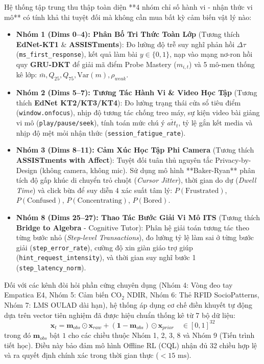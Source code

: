 \documentclass[11pt,a4paper]{article}
\begin{document}
Hệ thống tập trung thu thập toàn diện **4 nhóm chỉ số hành vi - nhận thức vi mô** có tính khả thi tuyệt đối mà không cần mua bất kỳ cảm biến vật lý nào:
\begin{itemize}
  \item \textbf{Nhóm 1 (Dims 0--4): Phân Bố Tri Thức Toàn Lớp} (Tương thích \textbf{EdNet-KT1} \& \textbf{ASSISTments}): Đo lường độ trễ suy nghĩ phản hồi $\Delta\tau$ (\texttt{ms\_first\_response}), kết quả làm bài $y \in \{0, 1\}$, nạp vào mạng nơ-ron hồi quy \textbf{GRU-DKT} để giải mã điểm Probe Mastery ($m_{i, t}$) và 5 mô-men thống kê lớp: $\bar{m}, Q_{25}, Q_{75}, \text{Var}(m), \rho_{weak}$.
  \item \textbf{Nhóm 2 (Dims 5--7): Tương Tác Hành Vi \& Video Học Tập} (Tương thích \textbf{EdNet KT2/KT3/KT4}): Đo lường trạng thái cửa sổ tiêu điểm (\texttt{window.onfocus}), nhịp độ tương tác chống treo máy, sự kiện video bài giảng vi mô (\texttt{play/pause/seek}), tính toán mức chú ý $\bar{att}_t$, tỷ lệ gắn kết media và nhịp độ mệt mỏi nhận thức (\texttt{session\_fatigue\_rate}).
  \item \textbf{Nhóm 3 (Dims 8--11): Cảm Xúc Học Tập Phi Camera} (Tương thích \textbf{ASSISTments with Affect}): Tuyệt đối tuân thủ nguyên tắc Privacy-by-Design (không camera, không mic). Sử dụng mô hình **Baker-Ryan** phân tích độ gấp khúc di chuyển trỏ chuột (\textit{Cursor Jitter}), thời gian do dự (\textit{Dwell Time}) và click bừa để suy diễn 4 xác suất tâm lý: $P(\text{Frustrated})$, $P(\text{Confused})$, $P(\text{Concentrating})$, $P(\text{Bored})$.
  \item \textbf{Nhóm 8 (Dims 25--27): Thao Tác Bước Giải Vi Mô ITS} (Tương thích \textbf{Bridge to Algebra} - Cognitive Tutor): Phân hệ giải toán tương tác theo từng bước nhỏ (\textit{Step-level Transactions}), đo lường tỷ lệ làm sai ở từng bước giải (\texttt{step\_error\_rate}), cường độ xin giàn giáo trợ giúp (\texttt{hint\_request\_intensity}), và thời gian suy nghĩ bước 1 (\texttt{step\_latency\_norm}).
\end{itemize}

\begin{stepbox}
Đối với các kênh đòi hỏi phần cứng chuyên dụng (Nhóm 4: Vòng đeo tay Empatica E4, Nhóm 5: Cảm biến $\text{CO}_2$ NDIR, Nhóm 6: Thẻ RFID SocioPatterns, Nhóm 7: LMS OULAD dài hạn), hệ thống áp dụng cơ chế điền khuyết tự động dựa trên vector tiên nghiệm đã được hiệu chuẩn thống kê từ 7 bộ dữ liệu:
\begin{equation}
  \mathbf{x}_t = \mathbf{m}_{obs} \odot \mathbf{x}_{raw} + (\mathbf{1} - \mathbf{m}_{obs}) \odot \mathbf{x}_{prior} \quad \in [0, 1]^{32}
\end{equation}
trong đó $\mathbf{m}_{obs}$ bật $1$ cho các chiều thuộc Nhóm 1, 2, 3, 8 và Nhóm 9 (Tiến trình tiết học). Điều này bảo đảm mô hình Offline RL (CQL) nhận đủ 32 chiều hợp lệ và ra quyết định chính xác trong thời gian thực ($< 15\text{ ms}$).
\end{stepbox}
\end{document}

